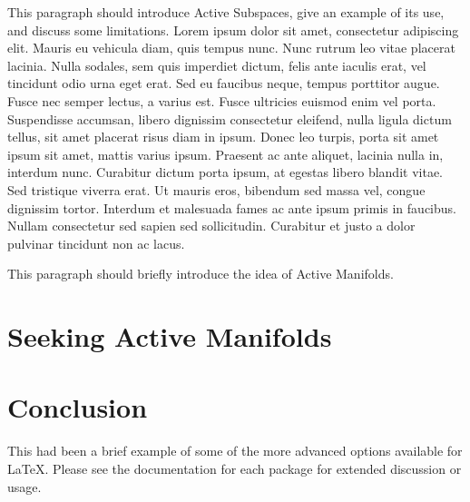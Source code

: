 \documentclass[]{aiaa-tc}%
\begin{document}
This paragraph should introduce Active Subspaces, give an example of its use, and discuss some limitations. \cite{constantine2015} Lorem ipsum dolor sit amet, consectetur adipiscing elit. Mauris eu vehicula diam, quis tempus nunc. Nunc rutrum leo vitae placerat lacinia. Nulla sodales, sem quis imperdiet dictum, felis ante iaculis erat, vel tincidunt odio urna eget erat. Sed eu faucibus neque, tempus porttitor augue. Fusce nec semper lectus, a varius est. Fusce ultricies euismod enim vel porta. Suspendisse accumsan, libero dignissim consectetur eleifend, nulla ligula dictum tellus, sit amet placerat risus diam in ipsum. Donec leo turpis, porta sit amet ipsum sit amet, mattis varius ipsum. Praesent ac ante aliquet, lacinia nulla in, interdum nunc. Curabitur dictum porta ipsum, at egestas libero blandit vitae. Sed tristique viverra erat. Ut mauris eros, bibendum sed massa vel, congue dignissim tortor. Interdum et malesuada fames ac ante ipsum primis in faucibus. Nullam consectetur sed sapien sed sollicitudin. Curabitur et justo a dolor pulvinar tincidunt non ac lacus.

This paragraph should briefly introduce the idea of Active Manifolds.

\section{Seeking Active Manifolds}



\section{Conclusion}

This had been a brief example of some of the more advanced options
available for \LaTeX.
Please see the documentation for each package for extended discussion or
usage.



\end{document}
